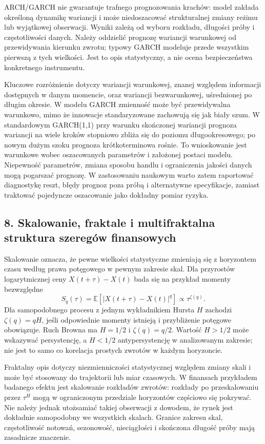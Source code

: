 \documentclass[11pt,a4paper]{article}
\begin{document}
ARCH/GARCH nie gwarantuje trafnego prognozowania krachów: model zakłada określoną dynamikę wariancji i może niedoszacować strukturalnej zmiany reżimu lub wyjątkowej obserwacji. Wyniki zależą od wyboru rozkładu, długości próby i częstotliwości danych. Należy oddzielić prognozę wariancji warunkowej od przewidywania kierunku zwrotu; typowy GARCH modeluje przede wszystkim pierwszą z tych wielkości. Jest to opis statystyczny, a nie ocena bezpieczeństwa konkretnego instrumentu.

Kluczowe rozróżnienie dotyczy wariancji warunkowej, znanej względem informacji dostępnych w danym momencie, oraz wariancji bezwarunkowej, uśrednionej po długim okresie. W modelu GARCH zmienność może być przewidywalna warunkowo, mimo że innowacje standaryzowane zachowują się jak biały szum. W standardowym GARCH(1,1) przy warunku skończonej wariancji prognoza wariancji na wiele kroków stopniowo zbliża się do poziomu długookresowego; po nowym dużym szoku prognoza krótkoterminowa rośnie. To wnioskowanie jest warunkowe wobec oszacowanych parametrów i założonej postaci modelu. Niepewność parametrów, zmiana sposobu handlu i ograniczenia jakości danych mogą pogarszać prognozę. W zastosowaniu naukowym warto zatem raportować diagnostykę reszt, błędy prognoz poza próbą i alternatywne specyfikacje, zamiast traktować pojedyncze oszacowanie jako dokładny pomiar ryzyka.

\subsection{8. Skalowanie, fraktale i multifraktalna struktura szeregów finansowych}

Skalowanie oznacza, że pewne wielkości statystyczne zmieniają się z horyzontem czasu według prawa potęgowego w pewnym zakresie skal. Dla przyrostów logarytmicznej ceny \(X(t+\tau)-X(t)\) bada się na przykład momenty bezwzględne
\[
S_q(\tau)=\mathbb E\!\left[|X(t+\tau)-X(t)|^q\right]
\propto \tau^{\zeta(q)}.
\]
Dla samopodobnego procesu z jednym wykładnikiem Hursta \(H\) zachodzi \(\zeta(q)=qH\), jeśli odpowiednie momenty istnieją i przybliżenie potęgowe obowiązuje. Ruch Browna ma \(H=1/2\) i \(\zeta(q)=q/2\). Wartość \(H>1/2\) może wskazywać persystencję, a \(H<1/2\) antypersystencję w analizowanym zakresie; nie jest to samo co korelacja prostych zwrotów w każdym horyzoncie.

Fraktalny opis dotyczy niezmienniczości statystycznej względem zmiany skali i może być stosowany do trajektorii lub miar czasowych. W finansach przykładem badanego efektu jest skalowanie rozkładów zwrotów: rozkłady po przeskalowaniu przez \(\tau^H\) mogą w ograniczonym przedziale horyzontów częściowo się pokrywać. Nie należy jednak utożsamiać takiej obserwacji z dowodem, że rynek jest dokładnie samopodobny we wszystkich skalach. Granice zakresu skal, częstotliwość notowań, sezonowość, nieciągłości i skończona długość próby mają zasadnicze znaczenie.
\end{document}
